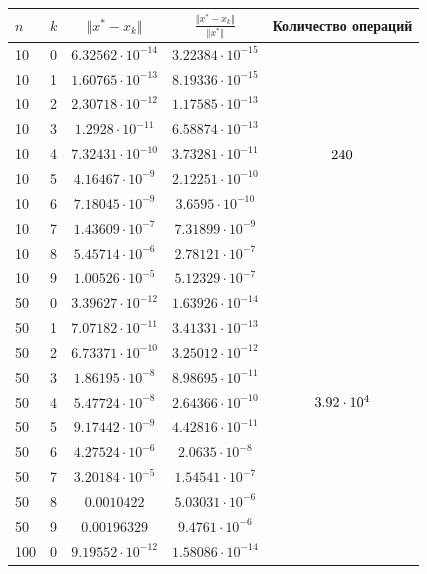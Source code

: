\documentclass[english]{article}
\begin{document}
\begin{center}
  \begin{longtable}{l|l|c|c|c}
    \(n\) & \(k\) & \(\Vert x^* - x_k \Vert\) & \(\frac{\Vert x^* - x_k \Vert}{\Vert x^* \Vert}\) & Количество операций\\
    \hline
    10 & 0 & \(6.32562\cdot 10^{-14}\) & \(3.22384\cdot 10^{-15}\) & \\
    10 & 1 & \(1.60765\cdot 10^{-13}\) & \(8.19336\cdot 10^{-15}\) & \\
    10 & 2 & \(2.30718\cdot 10^{-12}\) & \(1.17585\cdot 10^{-13}\) & \\
    10 & 3 & \(1.2928\cdot 10^{-11}\) & \(6.58874\cdot 10^{-13}\) & \\
    10 & 4 & \(7.32431\cdot 10^{-10}\) & \(3.73281\cdot 10^{-11}\) & \({\large 240}\)\\
    10 & 5 & \(4.16467\cdot 10^{-9}\) & \(2.12251\cdot 10^{-10}\) & \\
    10 & 6 & \(7.18045\cdot 10^{-9}\) & \(3.6595\cdot 10^{-10}\) & \\
    10 & 7 & \(1.43609\cdot 10^{-7}\) & \(7.31899\cdot 10^{-9}\) & \\
    10 & 8 & \(5.45714\cdot 10^{-6}\) & \(2.78121\cdot 10^{-7}\) & \\
    10 & 9 & \(1.00526\cdot 10^{-5}\) & \(5.12329\cdot 10^{-7}\) & \\
    \hline
    50 & 0 & \(3.39627\cdot 10^{-12}\) & \(1.63926\cdot 10^{-14}\) & \\
    50 & 1 & \(7.07182\cdot 10^{-11}\) & \(3.41331\cdot 10^{-13}\) & \\
    50 & 2 & \(6.73371\cdot 10^{-10}\) & \(3.25012\cdot 10^{-12}\) & \\
    50 & 3 & \(1.86195\cdot 10^{-8}\) & \(8.98695\cdot 10^{-11}\) & \\
    50 & 4 & \(5.47724\cdot 10^{-8}\) & \(2.64366\cdot 10^{-10}\) & \({\large 3.92 \cdot 10^4}\) \\
    50 & 5 & \(9.17442\cdot 10^{-9}\) & \(4.42816\cdot 10^{-11}\) & \\
    50 & 6 & \(4.27524\cdot 10^{-6}\) & \(2.0635\cdot 10^{-8}\) & \\
    50 & 7 & \(3.20184\cdot 10^{-5}\) & \(1.54541\cdot 10^{-7}\) & \\
    50 & 8 & \(0.0010422\) & \(5.03031\cdot 10^{-6}\) & \\
    50 & 9 & \(0.00196329\) & \(9.4761\cdot 10^{-6}\) & \\
    \hline
    100 & 0 & \(9.19552\cdot 10^{-12}\) & \(1.58086\cdot 10^{-14}\) & \\

\end{longtable}
\end{center}
\end{document}
